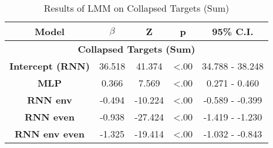 \begin{table}[h]
\centering
\caption{Results of LMM on Collapsed Targets (Sum)}
\label{collapsed_lmm_33}
\begin{tabular}{ccccc}
\hline
\textbf{Model}           & \textbf{$\beta$} & \textbf{Z} & \textbf{p} & \textbf{95\% C.I.} \\ \hline
\multicolumn{5}{c}{\textbf{Collapsed Targets (Sum)}}                                                 \\ \hline
\textbf{Intercept (RNN)} & 36.518                & 41.374     & \textless .00   & 34.788 - 38.248      \\
\textbf{MLP}           & 0.366                 & 7.569     & \textless .00   & 0.271 - 0.460        \\
\textbf{RNN env}          & -0.494                 & -10.224     & \textless .00   & -0.589 - -0.399        \\
\textbf{RNN even}            & -0.938                 & -27.424     & \textless .00   & -1.419 - -1.230        \\
\textbf{RNN env even}             & -1.325                 & -19.414     & \textless .00   & -1.032 - -0.843        \\ \hline
\end{tabular}
\end{table}